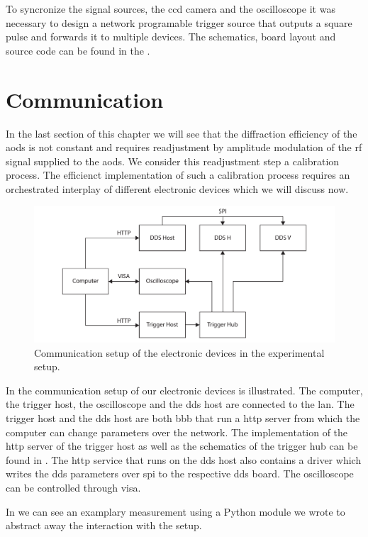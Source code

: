 To syncronize the signal sources, the \gls{ccd} camera and the oscilloscope
it was necessary to design a network programable trigger source that outputs
a square pulse and forwards it to multiple devices. The schematics, board
layout and source code can be found in the .

\section{Communication}

In the last section of this chapter we will see that the diffraction
efficiency of the \gls{aod}s is not constant and requires readjustment by
amplitude modulation of the \gls{rf} signal supplied to the \gls{aod}s. We
consider this readjustment step a calibration process. The efficienct
implementation of such a calibration process requires an orchestrated
interplay of different electronic devices which we will discuss now.
\begin{figure}[htb]
  \centering
  \includegraphics[width=\textwidth]{../figure/setup/network.pdf}
  \caption{Communication setup of the electronic devices in the experimental
    setup.
  }\label{fig:setup_network}
\end{figure}
In  the communication setup of our electronic devices
is illustrated. The computer, the trigger host, the oscilloscope and the
\gls{dds} host are connected to the \gls{lan}. The trigger host and the
\gls{dds} host are both \gls{bbb} that run a \gls{http} server from which the
computer can change parameters over the network. The implementation of the
\gls{http} server of the trigger host as well as the schematics of the trigger
hub can be found in . The \gls{http} service
that runs on the \gls{dds} host also contains a driver which writes the
\gls{dds} parameters over \gls{spi} to the respective \gls{dds} board. The
oscilloscope can be controlled through \gls{visa}.
In  we can see an examplary measurement using a
Python module we wrote to abstract away the interaction with the setup.

